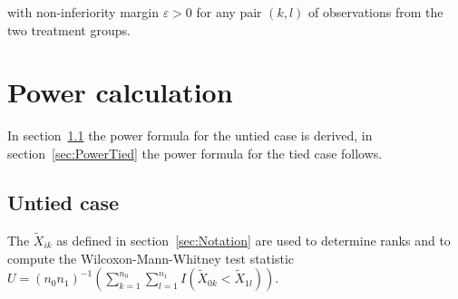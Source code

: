 \documentclass[bimj,fleqn]{w-art}\usepackage[]{graphicx}\usepackage[]{color}
\theoremstyle{plain}
\theoremstyle{definition}
\begin{document}
  with non-inferiority margin $\varepsilon > 0$ for any pair $(k, l)$ of
  observations from the two treatment groups.

  \section{Power calculation}
  \label{sec:Power}
  In section~\ref{sec:PowerUntied} the power formula for the untied case is
  derived, in section~\ref{sec:PowerTied} the power formula for the tied case
  follows.

  \subsection{Untied case}
  \label{sec:PowerUntied}
  The $\widetilde{X}_{ik}$ as defined in section~\ref{sec:Notation} are used to
	determine ranks and to compute the Wilcoxon-Mann-Whitney test statistic
	$ U =(n_0 n_1)^{-1}(\sum_{k=1}^{n_0}
	  \sum_{l=1}^{n_1}I(\widetilde{X}_{0k} < \widetilde{X}_{1l})) $.
\end{document}
